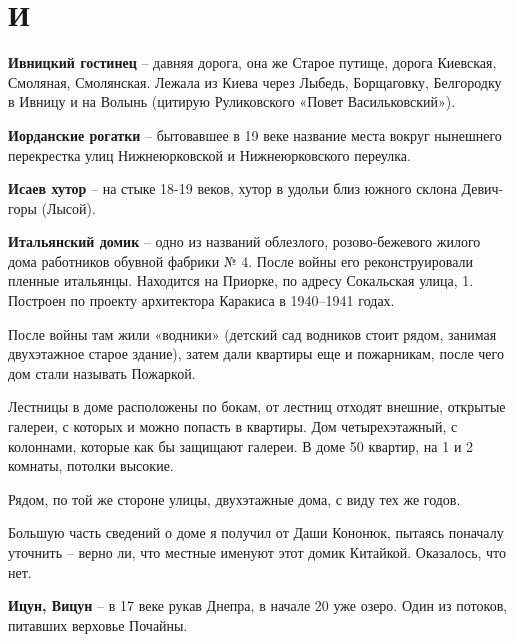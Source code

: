 \chapter*{И}


\textbf{Ивницкий гостинец} – давняя дорога, она же Старое путище, дорога Киевская, Смоляная, Смолянская. Лежала из Киева через Лыбедь, Борщаговку, Белгородку в Ивницу и на Волынь (цитирую Руликовского «Повет Васильковский»).\\ 

\medskip

\textbf{Иорданские рогатки} – бытовавшее в 19 веке название места вокруг нынешнего перекрестка улиц Нижнеюрковской и Нижнеюрковского переулка.\\

\medskip

\textbf{Исаев хутор} – на стыке 18-19 веков, хутор в удольи близ южного склона Девич-горы (Лысой).\\

\medskip

\textbf{Итальянский домик} – одно из названий облезлого, розово-бежевого жилого дома работников обувной фабрики № 4. После войны его реконструировали пленные итальянцы. Находится на Приорке, по адресу Сокальская улица, 1. Построен по проекту архитектора Каракиса в 1940–1941 годах. 

После войны там жили «водники» (детский сад водников стоит рядом, занимая двухэтажное старое здание), затем дали квартиры еще и пожарникам, после чего дом стали называть Пожаркой.

Лестницы в доме расположены по бокам, от лестниц отходят внешние, открытые галереи, с которых и можно попасть в квартиры. Дом четырехэтажный, с колоннами, которые как бы защищают галереи. В доме 50 квартир, на 1 и 2 комнаты, потолки высокие.

Рядом, по той же стороне улицы, двухэтажные дома, с виду тех же годов.

Большую часть сведений о доме я получил от Даши Кононюк, пытаясь поначалу уточнить – верно ли, что местные именуют этот домик Китайкой. Оказалось, что нет.\\

\medskip

\textbf{Ицун, Вицун} – в 17 веке рукав Днепра, в начале 20 уже озеро. Один из потоков, питавших верховье Почайны.
